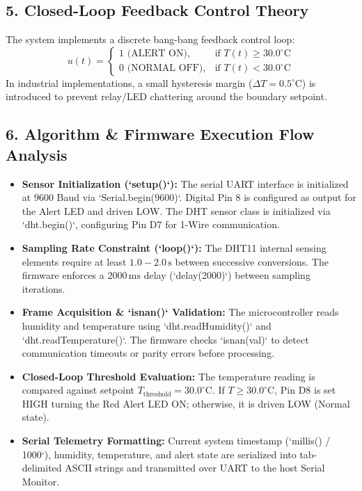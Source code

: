 \documentclass[11pt,a4paper]{article}
\begin{document}
\subsection*{5. Closed-Loop Feedback Control Theory}
The system implements a discrete bang-bang feedback control loop:
\begin{equation}
u(t) = \begin{cases} 1 \text{ (ALERT ON)}, & \text{if } T(t) \ge 30.0^\circ\text{C} \\ 0 \text{ (NORMAL OFF)}, & \text{if } T(t) < 30.0^\circ\text{C} \end{cases}
\end{equation}
In industrial implementations, a small hysteresis margin ($\Delta T = 0.5^\circ\text{C}$) is introduced to prevent relay/LED chattering around the boundary setpoint.

\subsection*{6. Algorithm \& Firmware Execution Flow Analysis}
\begin{itemize}[leftmargin=*]
    \item \textbf{Sensor Initialization (`setup()`):} The serial UART interface is initialized at 9600 Baud via `Serial.begin(9600)`. Digital Pin 8 is configured as output for the Alert LED and driven LOW. The DHT sensor class is initialized via `dht.begin()`, configuring Pin D7 for 1-Wire communication.
    \item \textbf{Sampling Rate Constraint (`loop()`):} The DHT11 internal sensing elements require at least $1.0-2.0\,\text{s}$ between successive conversions. The firmware enforces a $2000\,\text{ms}$ delay (`delay(2000)`) between sampling iterations.
    \item \textbf{Frame Acquisition \& `isnan()` Validation:} The microcontroller reads humidity and temperature using `dht.readHumidity()` and `dht.readTemperature()`. The firmware checks `isnan(val)` to detect communication timeouts or parity errors before processing.
    \item \textbf{Closed-Loop Threshold Evaluation:} The temperature reading is compared against setpoint $T_{\text{threshold}} = 30.0^\circ\text{C}$. If $T \ge 30.0^\circ\text{C}$, Pin D8 is set HIGH turning the Red Alert LED ON; otherwise, it is driven LOW (Normal state).
    \item \textbf{Serial Telemetry Formatting:} Current system timestamp (`millis() / 1000`), humidity, temperature, and alert state are serialized into tab-delimited ASCII strings and transmitted over UART to the host Serial Monitor.
\end{itemize}
\end{document}
